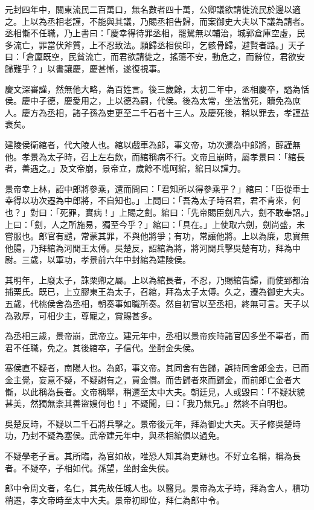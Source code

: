 \begin{pinyinscope}
元封四年中，關東流民二百萬口，無名數者四十萬，公卿議欲請徙流民於邊以適之。上以為丞相老謹，不能與其議，乃賜丞相告歸，而案御史大夫以下議為請者。丞相慚不任職，乃上書曰：「慶幸得待罪丞相，罷駑無以輔治，城郭倉庫空虛，民多流亡，罪當伏斧質，上不忍致法。願歸丞相侯印，乞骸骨歸，避賢者路。」天子曰：「倉廩既空，民貧流亡，而君欲請徙之，搖蕩不安，動危之，而辭位，君欲安歸難乎？」以書讓慶，慶甚慚，遂復視事。

慶文深審謹，然無他大略，為百姓言。後三歲餘，太初二年中，丞相慶卒，謚為恬侯。慶中子德，慶愛用之，上以德為嗣，代侯。後為太常，坐法當死，贖免為庶人。慶方為丞相，諸子孫為吏更至二千石者十三人。及慶死後，稍以罪去，孝謹益衰矣。

建陵侯衛綰者，代大陵人也。綰以戲車為郎，事文帝，功次遷為中郎將，醇謹無他。孝景為太子時，召上左右飲，而綰稱病不行。文帝且崩時，屬孝景曰：「綰長者，善遇之。」及文帝崩，景帝立，歲餘不噍呵綰，綰日以謹力。

景帝幸上林，詔中郎將參乘，還而問曰：「君知所以得參乘乎？」綰曰：「臣從車士幸得以功次遷為中郎將，不自知也。」上問曰：「吾為太子時召君，君不肯來，何也？」對曰：「死罪，實病！」上賜之劍。綰曰：「先帝賜臣劍凡六，劍不敢奉詔。」上曰：「劍，人之所施易，獨至今乎？」綰曰：「具在。」上使取六劍，劍尚盛，未嘗服也。郎官有譴，常蒙其罪，不與他將爭；有功，常讓他將。上以為廉，忠實無他腸，乃拜綰為河閒王太傅。吳楚反，詔綰為將，將河閒兵擊吳楚有功，拜為中尉。三歲，以軍功，孝景前六年中封綰為建陵侯。

其明年，上廢太子，誅栗卿之屬。上以為綰長者，不忍，乃賜綰告歸，而使郅都治捕栗氏。既已，上立膠東王為太子，召綰，拜為太子太傅。久之，遷為御史大夫。五歲，代桃侯舍為丞相，朝奏事如職所奏。然自初官以至丞相，終無可言。天子以為敦厚，可相少主，尊寵之，賞賜甚多。

為丞相三歲，景帝崩，武帝立。建元年中，丞相以景帝疾時諸官囚多坐不辜者，而君不任職，免之。其後綰卒，子信代。坐酎金失侯。

塞侯直不疑者，南陽人也。為郎，事文帝。其同舍有告歸，誤持同舍郎金去，已而金主覺，妄意不疑，不疑謝有之，買金償。而告歸者來而歸金，而前郎亡金者大慚，以此稱為長者。文帝稱舉，稍遷至太中大夫。朝廷見，人或毀曰：「不疑狀貌甚美，然獨無柰其善盜嫂何也！」不疑聞，曰：「我乃無兄。」然終不自明也。

吳楚反時，不疑以二千石將兵擊之。景帝後元年，拜為御史大夫。天子修吳楚時功，乃封不疑為塞侯。武帝建元年中，與丞相綰俱以過免。

不疑學老子言。其所臨，為官如故，唯恐人知其為吏跡也。不好立名稱，稱為長者。不疑卒，子相如代。孫望，坐酎金失侯。

郎中令周文者，名仁，其先故任城人也。以醫見。景帝為太子時，拜為舍人，積功稍遷，孝文帝時至太中大夫。景帝初即位，拜仁為郎中令。


\end{pinyinscope}
